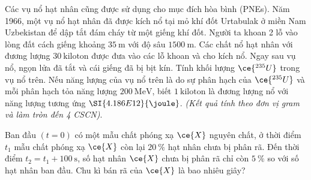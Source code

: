 \begin{ex}
	Các vụ nổ hạt nhân cũng được sử dụng cho mục đích hòa bình (PNEs). Năm 1966, một vụ nổ hạt nhân đã được kích nổ tại mỏ khí đốt Urtabulak ở miền Nam Uzbekistan để dập tắt đám cháy từ một giếng khí đốt. Người ta khoan 2 lỗ vào lòng đất cách giếng khoảng $\SI{35}{\meter}$ với độ sâu $\SI{1500}{\meter}$. Các chất nổ hạt nhân với đương lượng $\SI{30}{\text{kiloton}}$ được đưa vào các lỗ khoan và cho kích nổ. Ngay sau vụ nổ, ngọn lửa đã tắt và cái giếng đã bị bịt kín. Tính khối lượng $\ce{^{235}U}$ trong vụ nổ trên. Nếu năng lượng của vụ nổ trên là do sự phân hạch của $\ce{^{235}U}$ và mỗi phân hạch tỏa năng lượng $\SI{200}{\mega\electronvolt}$, biết $\SI{1}{\text{kiloton}}$ là đương lượng nổ với năng lượng tương ứng $\SI{4.186E12}{\joule}$. \textit{(Kết quả tính theo đơn vị gram và làm tròn đến 4 CSCN)}.
\end{ex}
\begin{ex}
Ban đầu $\left(t=0\right)$ có một mẫu chất phóng xạ $\ce{X}$ nguyên chất, ở thời điểm $t_1$ mẫu chất phóng xạ $\ce{X}$ còn lại $\SI{20}{\percent}$ hạt nhân chưa bị phân rã. Đến thời điểm $t_2=t_1+\SI{100}{\second}$, số hạt nhân $\ce{X}$ chưa bị phân rã chỉ còn $\SI{5}{\percent}$ so với số hạt nhân ban đầu. Chu kì bán rã của $\ce{X}$ là bao nhiêu giây?	
\end{ex}
